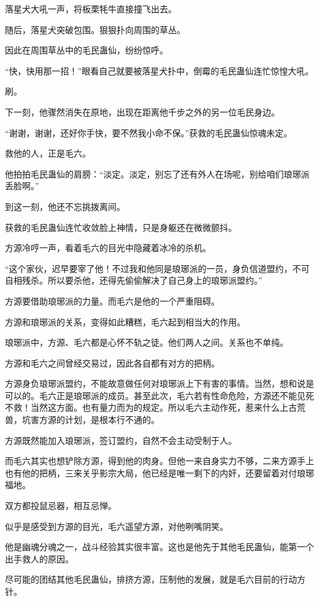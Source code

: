 \begin{this_body}
落星犬大吼一声，将板栗牦牛直接撞飞出去。

随后，落星犬突破包围。狠狠扑向周围的草丛。

因此在周围草丛中的毛民蛊仙，纷纷惊呼。

“快，快用那一招！”眼看自己就要被落星犬扑中，倒霉的毛民蛊仙连忙惊惶大吼。

刷。

下一刻，他骤然消失在原地，出现在距离他千步之外的另一位毛民身边。

“谢谢，谢谢，还好你手快，要不然我小命不保。”获救的毛民蛊仙惊魂未定。

救他的人，正是毛六。

他拍拍毛民蛊仙的肩膀：“淡定。淡定，别忘了还有外人在场呢，别给咱们琅琊派丢脸啊。”

到这一刻，他还不忘挑拨离间。

获救的毛民蛊仙连忙收敛脸上神情，只是身躯还在微微颤抖。

方源冷哼一声，看着毛六的目光中隐藏着冰冷的杀机。

“这个家伙，迟早要宰了他！不过我和他同是琅琊派的一员，身负信道盟约，不可自相残杀。所以要杀他，还得先偷偷解决了自己身上的琅琊派盟约。”

方源要借助琅琊派的力量。而毛六是他的一个严重阻碍。

方源和琅琊派的关系，变得如此糟糕，毛六起到相当大的作用。

琅琊派中，方源、毛六都是心怀不轨之徒。他们两人之间。关系也不单纯。

方源和毛六之间曾经交易过，因此各自都有对方的把柄。

方源身负琅琊派盟约，不能故意做任何对琅琊派上下有害的事情。当然，想和说是可以的。毛六正是琅琊派的成员。甚至此次，毛六若有性命危险，方源还不能见死不救！当然这方面。也有量力而为的规定。所以毛六主动作死，惹来什么上古荒兽，坑害方源的计划，是根本行不通的。

方源既然能加入琅琊派，签订盟约，自然不会主动受制于人。

而毛六其实也想铲除方源，得到他的肉身。但他一来自身实力不够，二来方源手上也有他的把柄，三来关乎影宗大局，他已经是唯一剩下的内奸，还要留着对付琅琊福地。

双方都投鼠忌器，相互忌惮。

似乎是感受到方源的目光，毛六遥望方源，对他咧嘴阴笑。

他是幽魂分魂之一，战斗经验其实很丰富。这也是他先于其他毛民蛊仙，能第一个出手救人的原因。

尽可能的团结其他毛民蛊仙，排挤方源，压制他的发展，就是毛六目前的行动方针。


\end{this_body}
